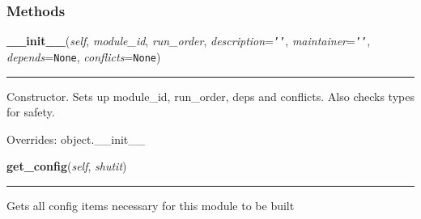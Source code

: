
  \subsubsection{Methods}

    \vspace{0.5ex}

\hspace{.8\funcindent}\begin{boxedminipage}{\funcwidth}

    \raggedright \textbf{\_\_init\_\_}(\textit{self}, \textit{module\_id}, \textit{run\_order}, \textit{description}={\tt \texttt{'}\texttt{}\texttt{'}}, \textit{maintainer}={\tt \texttt{'}\texttt{}\texttt{'}}, \textit{depends}={\tt None}, \textit{conflicts}={\tt None})

    \vspace{-1.5ex}

    \rule{\textwidth}{0.5\fboxrule}
\setlength{\parskip}{2ex}
    Constructor. Sets up module\_id, run\_order, deps and conflicts. Also 
    checks types for safety.

\setlength{\parskip}{1ex}
      Overrides: object.\_\_init\_\_

    \end{boxedminipage}

    \label{shutit_module:ShutItModule:get_config}

    \vspace{0.5ex}

\hspace{.8\funcindent}\begin{boxedminipage}{\funcwidth}

    \raggedright \textbf{get\_config}(\textit{self}, \textit{shutit})

    \vspace{-1.5ex}

    \rule{\textwidth}{0.5\fboxrule}
\setlength{\parskip}{2ex}
    Gets all config items necessary for this module to be built

\setlength{\parskip}{1ex}
    \end{boxedminipage}

